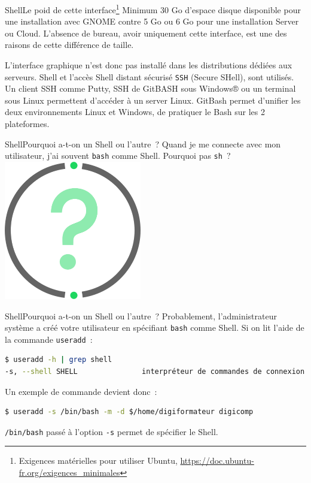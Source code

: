 \documentclass{beamer}
\begin{document}
    \begin{frame}{Shell}{Le poid de cette interface\footnote{Exigences matérielles pour utiliser Ubuntu, \url{https://doc.ubuntu-fr.org/exigences_minimales}}}
        Minimum 30 Go d'espace disque disponible pour une installation avec GNOME contre 5 Go ou 6 Go pour une installation Server ou Cloud.
        \bigbreak
        L'absence de bureau, avoir uniquement cette interface, est une des raisons de cette différence de taille.

        L'interface graphique n'est donc pas installé dans les distributions dédiées aux serveurs.
        Shell et l'accès Shell distant sécurisé \lstinline{SSH} (Secure SHell), sont utilisés.
        Un client SSH comme Putty, SSH de GitBASH sous Windows® ou un terminal sous Linux permettent d'accéder à un server Linux.
        \bigbreak
        GitBash permet d'unifier les deux environnements Linux et Windows, de pratiquer le Bash sur les 2 plateformes.
    \end{frame}

    \begin{frame}{Shell}{Pourquoi a-t-on un Shell ou l'autre~?}
        Quand je me connecte avec mon utilisateur, j'ai souvent \lstinline{bash} comme Shell.
        Pourquoi pas \lstinline{sh}~?
        \bigbreak
        \centering
        \includegraphics[width=6cm]{image/question-mark}
    \end{frame}

    \begin{frame}[fragile]{Shell}{Pourquoi a-t-on un Shell ou l'autre~?}
        Probablement, l'administrateur système a créé votre utilisateur en spécifiant \lstinline{bash} comme Shell.
        \bigbreak
        Si on lit l'aide de la commande \lstinline{useradd}~:
        \begin{lstlisting}[language=bash]
$ useradd -h | grep shell
-s, --shell SHELL               interpréteur de commandes de connexion du nouveau compte
        \end{lstlisting}
        \bigbreak
        Un exemple de commande devient donc~:
        \begin{lstlisting}[language=bash]
$ useradd -s /bin/bash -m -d $/home/digiformateur digicomp
        \end{lstlisting}
        \bigbreak
        \lstinline{/bin/bash} passé à l'option \lstinline{-s} permet de spécifier le Shell.
    \end{frame}
\end{document}
